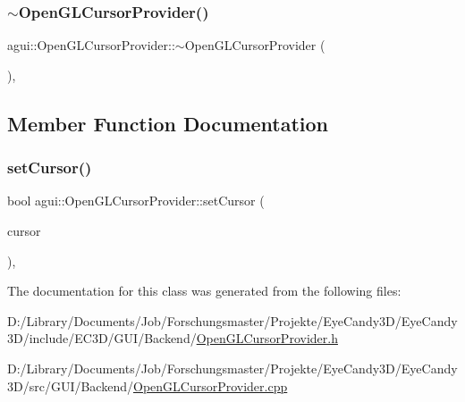 \subsubsection{\texorpdfstring{$\sim$\+Open\+G\+L\+Cursor\+Provider()}{~OpenGLCursorProvider()}}
{\footnotesize\ttfamily agui\+::\+Open\+G\+L\+Cursor\+Provider\+::$\sim$\+Open\+G\+L\+Cursor\+Provider (\begin{DoxyParamCaption}{ }\end{DoxyParamCaption})\hspace{0.3cm}{\ttfamily [virtual]}, {\ttfamily [default]}}



\subsection{Member Function Documentation}
\mbox{\label{classagui_1_1_open_g_l_cursor_provider_a1a01c10c941263b5deaf339a86c80b31}} 
\subsubsection{\texorpdfstring{set\+Cursor()}{setCursor()}}
{\footnotesize\ttfamily bool agui\+::\+Open\+G\+L\+Cursor\+Provider\+::set\+Cursor (\begin{DoxyParamCaption}\item[{Cursor\+Enum}]{cursor }\end{DoxyParamCaption})\hspace{0.3cm}{\ttfamily [override]}, {\ttfamily [virtual]}}



The documentation for this class was generated from the following files\+:\begin{DoxyCompactItemize}
\item 
D\+:/\+Library/\+Documents/\+Job/\+Forschungsmaster/\+Projekte/\+Eye\+Candy3\+D/\+Eye\+Candy3\+D/include/\+E\+C3\+D/\+G\+U\+I/\+Backend/\mbox{\hyperlink{_open_g_l_cursor_provider_8h}{Open\+G\+L\+Cursor\+Provider.\+h}}\item 
D\+:/\+Library/\+Documents/\+Job/\+Forschungsmaster/\+Projekte/\+Eye\+Candy3\+D/\+Eye\+Candy3\+D/src/\+G\+U\+I/\+Backend/\mbox{\hyperlink{_open_g_l_cursor_provider_8cpp}{Open\+G\+L\+Cursor\+Provider.\+cpp}}\end{DoxyCompactItemize}
